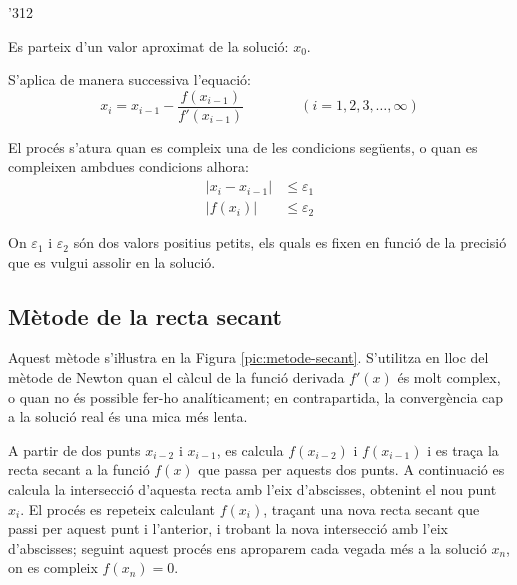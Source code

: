 \begin{dingautolist}{'312}
    \item Es parteix d'un valor aproximat de la solució: $x_0$.

    \item   S'aplica de manera successiva l'equació:
            \begin{equation}\label{eq:newton}
              x_i = x_{i-1} - \frac{f(x_{i-1})}{f'(x_{i-1})} \qquad\qquad (i=1,2,3,\dots,\infty)
            \end{equation}

    \item   El procés s'atura quan es compleix una de les condicions següents, o quan es compleixen ambdues condicions alhora:
            \begin{subequations}\begin{align}
              |x_i - x_{i-1}| &\leq \varepsilon_1 \\
              |f(x_i)| &\leq \varepsilon_2
            \end{align}\end{subequations}

            On $\varepsilon_1$ i $\varepsilon_2$ són dos valors positius petits, els quals es fixen en funció de la precisió que es vulgui assolir en la solució.
\end{dingautolist}



\subsection{Mètode de la recta secant}

Aquest mètode s'iŀlustra en la Figura \vref{pic:metode-secant}. S'utilitza en lloc del mètode de Newton quan el càlcul de  la funció derivada $f'(x)$ és molt complex, o quan no és possible fer-ho analíticament; en contrapartida, la convergència cap a la solució real és una
mica més lenta.

A partir de dos punts $x_{i-2}$ i $x_{i-1}$, es calcula $f(x_{i-2})$ i $f(x_{i-1})$ i es traça la recta secant a la funció $f(x)$ que passa per aquests dos punts. A continuació es calcula la intersecció d'aquesta recta amb l'eix d'abscisses, obtenint el nou punt $x_i$. El procés es repeteix calculant $f(x_i)$, traçant una nova recta secant que passi per aquest punt i l'anterior, i trobant la nova intersecció amb l'eix d'abscisses; seguint aquest procés ens aproparem cada vegada més a la solució $x_n$, on es compleix $f(x_n)=0$.

